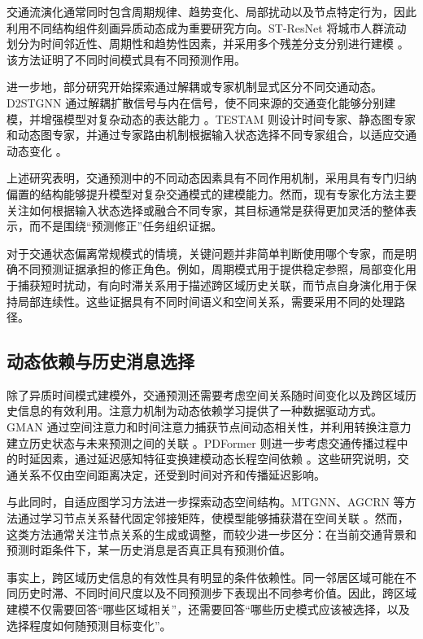 交通流演化通常同时包含周期规律、趋势变化、局部扰动以及节点特定行为，因此利用不同结构组件刻画异质动态成为重要研究方向。ST-ResNet 将城市人群流动划分为时间邻近性、周期性和趋势性因素，并采用多个残差分支分别进行建模 \cite{ref12}。该方法证明了不同时间模式具有不同预测作用。

进一步地，部分研究开始探索通过解耦或专家机制显式区分不同交通动态。D2STGNN 通过解耦扩散信号与内在信号，使不同来源的交通变化能够分别建模，并增强模型对复杂动态的表达能力 \cite{ref13}。TESTAM 则设计时间专家、静态图专家和动态图专家，并通过专家路由机制根据输入状态选择不同专家组合，以适应交通动态变化 \cite{ref14}。

上述研究表明，交通预测中的不同动态因素具有不同作用机制，采用具有专门归纳偏置的结构能够提升模型对复杂交通模式的建模能力。然而，现有专家化方法主要关注如何根据输入状态选择或融合不同专家，其目标通常是获得更加灵活的整体表示，而不是围绕“预测修正”任务组织证据。

对于交通状态偏离常规模式的情境，关键问题并非简单判断使用哪个专家，而是明确不同预测证据承担的修正角色。例如，周期模式用于提供稳定参照，局部变化用于捕获短时扰动，有向时滞关系用于描述跨区域历史关联，而节点自身演化用于保持局部连续性。这些证据具有不同时间语义和空间关系，需要采用不同的处理路径。

\subsection{动态依赖与历史消息选择}\label{sec:messages-related}

除了异质时间模式建模外，交通预测还需要考虑空间关系随时间变化以及跨区域历史信息的有效利用。注意力机制为动态依赖学习提供了一种数据驱动方式。GMAN 通过空间注意力和时间注意力捕获节点间动态相关性，并利用转换注意力建立历史状态与未来预测之间的关联 \cite{ref15}。PDFormer 则进一步考虑交通传播过程中的时延因素，通过延迟感知特征变换建模动态长程空间依赖 \cite{ref16}。这些研究说明，交通关系不仅由空间距离决定，还受到时间对齐和传播延迟影响。

与此同时，自适应图学习方法进一步探索动态空间结构。MTGNN、AGCRN 等方法通过学习节点关系替代固定邻接矩阵，使模型能够捕获潜在空间关联 \cite{ref06,ref07}。然而，这类方法通常关注节点关系的生成或调整，而较少进一步区分：在当前交通背景和预测时距条件下，某一历史消息是否真正具有预测价值。

事实上，跨区域历史信息的有效性具有明显的条件依赖性。同一邻居区域可能在不同历史时滞、不同时间尺度以及不同预测步下表现出不同参考价值。因此，跨区域建模不仅需要回答“哪些区域相关”，还需要回答“哪些历史模式应该被选择，以及选择程度如何随预测目标变化”。
